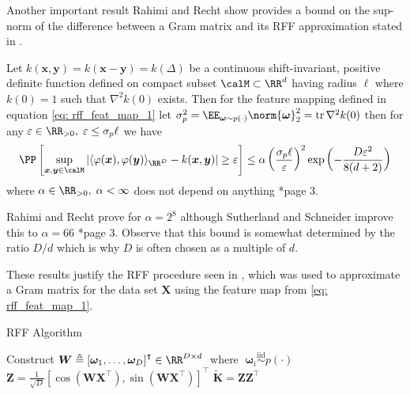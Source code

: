 Another important result Rahimi and Recht show provides a bound on the sup-norm of the difference between a Gram matrix and its RFF approximation stated in .

\begin{prop} \label{prop: rff_sup-norm_bound_1}
    Let $k(\bm{x} , \bm{y}) = k(\bm{x} - \bm{y}) = k( \Delta)$ be a continuous shift-invariant, positive definite function defined on compact subset $\calM \subset \RR^d$ having radius $\ell$ where $k(0) = 1$ such that $\nabla^2 k(0)$ exists. Then for the feature mapping defined in equation \ref{eq: rff_feat_map_1} let $\sigma_p^2 = \EE_{\bm{\omega} \sim p(\cdot)} \norm{\bm{\omega}}^2_2 = \operatorname{tr} \nabla^2 k(0)$ then for any $\varepsilon \in \RR_{>0}, \; \varepsilon \leq \sigma_p \ell$ we have
    \[
        \PP \left[ \sup_{\bm{x},\bm{y} \in \calM} \left| \langle \varphi (\bm{x}) , \varphi (\bm{y}) \rangle_{\RR^D} - k (\bm{x},\bm{y}) \right| \geq \varepsilon \right] \leq \alpha \left( \frac{\sigma_p \ell}{\varepsilon} \right)^2 \exp \left( - \frac{D \varepsilon^2}{8(d+2)} \right)
    \]
    where $\alpha \in \RR_{>0}, \; \alpha < \infty$ does not depend on anything \cite{NIPS2007_013a006f}*{page 3}.
\end{prop}

Rahimi and Recht prove  for $\alpha = 2^8$ although Sutherland and Schneider improve this to $\alpha = 66$ \cite{sutherland2015error}*{page 3}. Observe that this bound is somewhat determined by the ratio $D/d$ which is why $D$ is often chosen as a multiple of $d$.

These results justify the RFF procedure seen in , which was used to approximate a Gram matrix for the data set $\bm{X}$ using the feature map from \ref{eq: rff_feat_map_1}.

{\centering
\begin{minipage}{.85\linewidth}
    \begin{algorithm}[H]
        \caption{RFF Algorithm}
        \label{alg: RFF-algorithm}
        \SetAlgoLined
        \DontPrintSemicolon

        \BlankLine
        Construct $\bm{W} \triangleq \left[ \bm{\omega}_1 ,\ldots , \bm{\omega}_D \right]^{\intercal} \in \RR^{D \times d} \;$ where $\; \bm{\omega}_i \stackrel{\text{iid}}{\sim} p(\cdot)$\;
        $\bm{Z} = \frac{1}{\sqrt{D}} \left[ \cos \left( \bm{W} \bm{X}^{\intercal} \right), \sin \left( \bm{W} \bm{X}^{\intercal} \right) \right]^{\intercal}$\;
        $\bm{\widetilde{K}} = \bm{Z}\bm{Z}^{\intercal}$\;
        \BlankLine
    \end{algorithm}
\end{minipage}
\par
}

